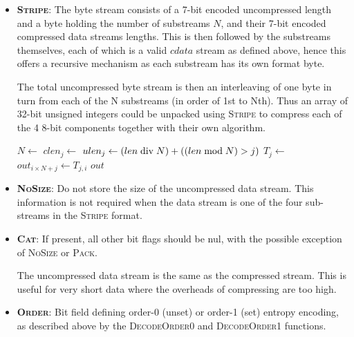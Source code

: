 \documentclass[a4paper]{article}
\begin{document}
\begin{itemize}
\item{\textbf{\textsc{Stripe}}:}
The byte stream consists of a 7-bit encoded uncompressed length and a
byte holding the number of substreams $N$, and their 7-bit encoded
compressed data streams lengths.  This is then followed by the
substreams themselves, each of which is a valid $cdata$ stream as
defined above, hence this offers a recursive mechanism as each
substream has its own format byte.

The total uncompressed byte stream is then an interleaving of one byte
in turn from each of the N substreams (in order of 1st to Nth).  Thus
an array of 32-bit unsigned integers could be unpacked using
\textsc{Stripe} to compress each of the 4 8-bit components together with
their own algorithm.

\begin{algorithmic}[1]
  \State $N \gets $
   
    \State $clen_j \gets $
  \EndFor
  \Statex
   
    \State $ulen_j \gets (len \bdiv N) + ((len \bmod N) > j)$
    \State $T_j \gets $
  \EndFor
  \Statex
   
      \State $out_{i \times N + j} \gets T_{j,i}$
    \EndFor
  \EndFor
  \State \Return $out$
\EndFunction
\end{algorithmic}

\item{\textbf{\textsc{NoSize}}:}
Do not store the size of the uncompressed data stream.
This information is not required when the data stream is one of the four sub-streams in the \textsc{Stripe} format.

\item{\textbf{\textsc{Cat}}:}
If present, all other bit flags should be nul, with the possible
exception of \textsc{NoSize} or \textsc{Pack}.

The uncompressed data stream is the same as the compressed stream.
This is useful for very short data where the overheads of compressing are too high.

\item{\textbf{\textsc{Order}}:}
Bit field defining order-0 (unset) or order-1 (set) entropy encoding, as described above by the \textsc{DecodeOrder0} and \textsc{DecodeOrder1} functions.


\end{itemize}
\end{document}
